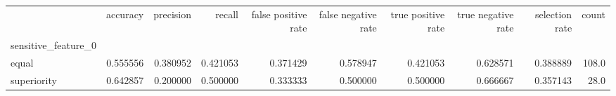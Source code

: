 \begin{tabular}{lrrrrrrrrr}
\toprule
{} &  accuracy &  precision &    recall &  false positive rate &  false negative rate &  true positive rate &  true negative rate &  selection rate &  count \\
sensitive\_feature\_0 &           &            &           &                      &                      &                     &                     &                 &        \\
\midrule
equal               &  0.555556 &   0.380952 &  0.421053 &             0.371429 &             0.578947 &            0.421053 &            0.628571 &        0.388889 &  108.0 \\
superiority         &  0.642857 &   0.200000 &  0.500000 &             0.333333 &             0.500000 &            0.500000 &            0.666667 &        0.357143 &   28.0 \\
\bottomrule
\end{tabular}
